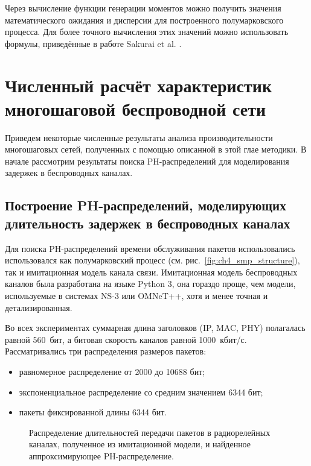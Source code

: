Через вычисление функции генерации моментов можно получить значения математического ожидания и дисперсии для построенного полумарковского процесса. Для более точного вычисления этих значений можно использовать формулы, приведённые в работе Sakurai et al. \cite{Sakurai2007}.





\section{Численный расчёт характеристик многошаговой беспроводной сети}\label{sec:ch4_numeric_results}
Приведем некоторые численные результаты анализа производительности многошаговых сетей, полученных с помощью описанной в этой глае методики. В начале рассмотрим результаты поиска PH-распределений для моделирования задержек в беспроводных каналах.

\subsection{Построение PH-распределений, моделирующих длительность задержек в беспроводных каналах}
Для поиска PH-распределений времени обслуживания пакетов использовались использовался как полумарковский процесс (см. рис.~\ref{fig:ch4_smp_structure}), так и имитационная модель канала связи. Имитационная модель беспроводных каналов была разработана на языке Python 3, она гораздо проще, чем модели, используемые в системах NS-3 или OMNeT++, хотя и менее точная и детализированная.

Во всех экспериментах суммарная длина заголовков (IP, MAC, PHY) полагалась равной 560~бит, а битовая скорость каналов равной 1000~кбит/с. Рассматривались три распределения размеров пакетов:

\begin{itemize}
	\item равномерное распределение от 2000 до 10688 бит;
	\item экспоненциальное распределение со средним значением 6344 бит;
	\item пакеты фиксированной длины 6344 бит.
\end{itemize}

\begin{figure}[h]
  \caption{Распределение длительностей передачи пакетов в радиорелейных каналах, полученное из имитационной модели, и найденное аппроксимирующее PH-распределение.}
  \label{fig:ch4_fitting_relay_delays}
\end{figure}


